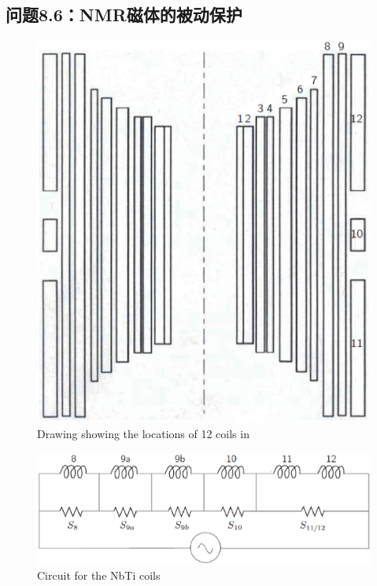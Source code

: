 \subsection{问题8.6：NMR磁体的被动保护}


\begin{figure}
	\centering
	\includegraphics[scale=0.6]{chpt8/figs/fig8.26.eps}
	\caption{Drawing showing the locations of 12 coils in }
\end{figure}


\begin{figure}
	\centering
	\includegraphics[scale=0.6]{chpt8/figs/fig8.27.eps}
	\caption{Circuit for the NbTi coils}
\end{figure}


